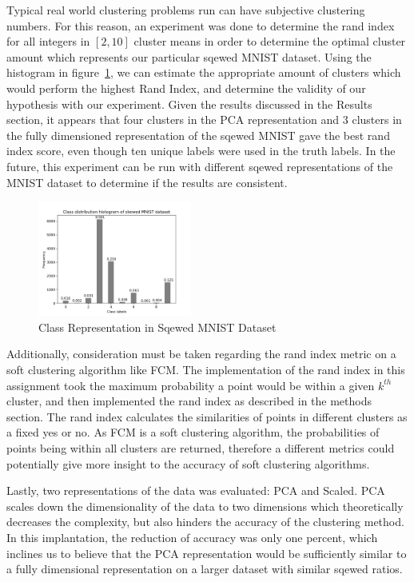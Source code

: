 Typical real world clustering problems run can have subjective clustering numbers. For this reason, an experiment was done to determine the rand index for all integers in $[2,10]$ cluster means in order to determine the optimal cluster amount which represents our particular sqewed MNIST dataset. Using the histogram in figure~\ref{fig:hist1}, we can estimate the appropriate amount of clusters which would perform the highest Rand Index, and determine the validity of our hypothesis with our experiment. Given the results discussed in the Results section, it appears that four clusters in the PCA representation and 3 clusters in the fully dimensioned representation of the sqewed MNIST gave the best rand index score, even though ten unique labels were used in the truth labels. In the future, this experiment can be run with different sqewed representations of the MNIST dataset to determine if the results are consistent. \par

\begin{figure}[H]
    \centering
    \includegraphics[width=0.45\textwidth]{class_histogram.png}
    \caption{Class Representation in Sqewed MNIST Dataset\label{fig:hist1}}    
\end{figure}

Additionally, consideration must be taken regarding the rand index metric on a soft clustering algorithm like FCM. The implementation of the rand index in this assignment took the maximum probability a point would be within a given $k^{th}$ cluster, and then implemented the rand index as described in the methods section. The rand index calculates the similarities of points in different clusters as a fixed yes or no. As FCM is a soft clustering algorithm, the probabilities of points being within all clusters are returned, therefore a different metrics could potentially give more insight to the accuracy of soft clustering algorithms. \par

Lastly, two representations of the data was evaluated: PCA and Scaled. PCA scales down the dimensionality of the data to two dimensions which theoretically decreases the complexity, but also hinders the accuracy of the clustering method. In this implantation, the reduction of accuracy was only one percent, which inclines us to believe that the PCA representation would be sufficiently similar to a fully dimensional representation on a larger dataset with similar sqewed ratios. \par